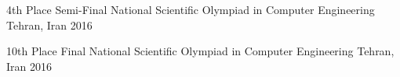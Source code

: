 



\begin{cvhonors}

  \cvhonor%
    {4th Place} %
    {Semi-Final National Scientific Olympiad in Computer Engineering} %
    {Tehran, Iran} %
    {2016} %

  \cvhonor%
    {10th Place} %
    {Final National Scientific Olympiad in Computer Engineering} %
    {Tehran, Iran} %
    {2016} %

\end{cvhonors}



